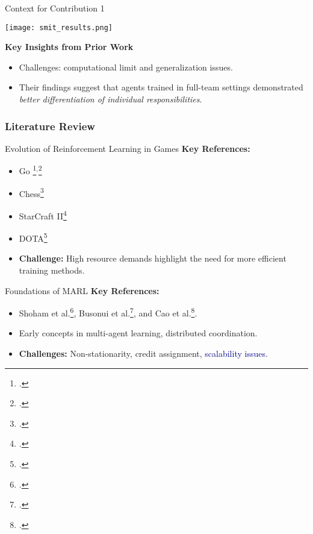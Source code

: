 \begin{frame}{Context for Contribution 1}
    \begin{table}
        \centering
        \texttt{[image: smit\_results.png]}
        \captionsetup{width=.75\linewidth}
        \caption{\footnotesize Win rate of row teams vs column teams;
            500 games of 11v11.~\footcite{smit2023}}
        \label{table:smit_winrates}
    \end{table}

    \textbf{Key Insights from Prior Work}
    \begin{itemize}
        \item Challenges: computational limit and generalization issues.
        \item Their findings suggest that agents trained in full-team settings demonstrated 
            \emph{better differentiation of individual responsibilities}.
    \end{itemize}
\end{frame}

\subsubsection{Literature Review}



\begin{frame}{Evolution of Reinforcement Learning in Games}
    \textbf{Key References:}
    \begin{itemize}
        \item Go \footcite{silver2016}$^,$\footcite{silver2017}
        \item Chess\footcite{silver2017a}
        \item StarCraft II\footcite{vinyals2019}
        \item DOTA\footcite{berner2019}
        \item \textbf{Challenge:} High resource demands highlight the need for more efficient 
            training methods.
    \end{itemize}
\end{frame}

\begin{frame}{Foundations of MARL}
    \textbf{Key References:}
    \begin{itemize}
        \item Shoham et al.\footcite{shoham2007}, Busonui et al.\footcite{busoniu2008}, 
            and Cao et al.\footcite{cao2012}.
        \item Early concepts in multi-agent learning, distributed coordination.
        \item \textbf{Challenges:} Non-stationarity, credit assignment, 
            \textcolor{DarkBlue}{scalability issues}.
    \end{itemize}
\end{frame}

